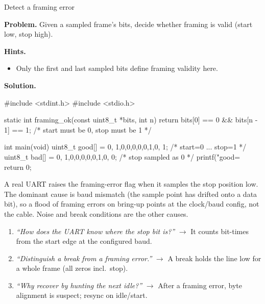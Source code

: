 \begin{gymproblem}{Detect a framing error}

\textbf{Problem.} Given a sampled frame's bits, decide whether framing is valid
(start low, stop high).

\textbf{Hints.}
\begin{itemize}
\item Only the first and last sampled bits define framing validity here.
\end{itemize}

\attempt

\textbf{Solution.}
\begin{cgym}
#include <stdint.h>
#include <stdio.h>

static int framing_ok(const uint8_t *bits, int n) {
    return bits[0] == 0 && bits[n - 1] == 1;   /* start must be 0, stop must be 1 */
}

int main(void) {
    uint8_t good[] = {0, 1,0,0,0,0,0,1,0, 1};   /* start=0 ... stop=1 */
    uint8_t bad[]  = {0, 1,0,0,0,0,0,1,0, 0};   /* stop sampled as 0  */
    printf("good=%
    return 0;
}
\end{cgym}

A real UART raises the framing-error flag when it samples the stop position low.
The dominant cause is baud mismatch (the sample point has drifted onto a data
bit), so a flood of framing errors on bring-up points at the clock/baud config,
not the cable. Noise and break conditions are the other causes.

\followups
\begin{enumerate}
\item \emph{``How does the UART know where the stop bit is?''} $\rightarrow$ It
  counts bit-times from the start edge at the configured baud.
\item \emph{``Distinguish a break from a framing error.''} $\rightarrow$ A
  break holds the line low for a whole frame (all zeros incl.\ stop).
\item \emph{``Why recover by hunting the next idle?''} $\rightarrow$ After a
  framing error, byte alignment is suspect; resync on idle/start.
\end{enumerate}
\end{gymproblem}


